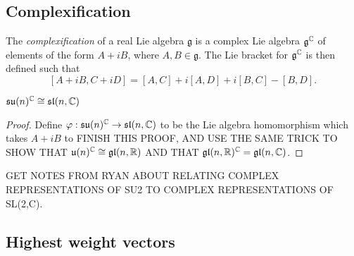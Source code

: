 \documentclass[class=article, crop=false]{standalone}
\begin{document}
\subsection{Complexification}
The \textit{complexification} of a real Lie algebra $\mathfrak{g}$ is a complex Lie algebra $\mathfrak{g}^{\mathbb{C}}$ of elements of the form $A+iB$, where $A,B \in \mathfrak{g}$. The Lie bracket for $\mathfrak{g}^{\mathbb{C}}$ is then defined such that
\[ [A+iB,C+iD]=[A,C]+i[A,D]+i[B,C]-[B,D]. \]
\begin{prop}
    $\mathfrak{su}(n)^{\mathbb{C}} \cong \mathfrak{sl}(n,\mathbb{C})$
\end{prop}
\begin{proof}
    Define $\varphi: \mathfrak{su}(n)^{\mathbb{C}} \rightarrow \mathfrak{sl}(n,\mathbb{C})$ to be the Lie algebra homomorphism which takes $A+iB$ to FINISH THIS PROOF, AND USE THE SAME TRICK TO SHOW THAT $\mathfrak{u}(n)^{\mathbb{C}} \cong \mathfrak{gl}(n,\mathbb{R})$ AND THAT $\mathfrak{gl}(n,\mathbb{R})^{\mathbb{C}} = \mathfrak{gl}(n, \mathbb{C})$.
\end{proof}

GET NOTES FROM RYAN ABOUT RELATING COMPLEX REPRESENTATIONS OF SU2 TO COMPLEX REPRESENTATIONS OF SL(2,C).

\subsection{Highest weight vectors}
\end{document}
